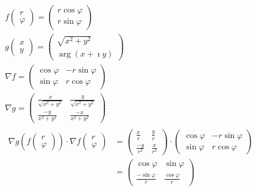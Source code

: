 \begin{bsp*}
	\begin{gather*}
		f\begin{pmatrix} r \\ \varphi \end{pmatrix} = \begin{pmatrix} r \cos \varphi \\ r \sin \varphi \end{pmatrix} \\
		g\begin{pmatrix} x \\ y \end{pmatrix} = \begin{pmatrix} \sqrt{x^2 + y^2} \\ \arg( x + \imath y ) \end{pmatrix} \\
		\nabla f = \begin{pmatrix} \cos \varphi &-r \sin \varphi \\ \sin \varphi & r \cos \varphi \end{pmatrix} \\
		\nabla g = \begin{pmatrix} \frac{x}{\sqrt{x^2+y^2}} & \frac{y}{\sqrt{x^2+y^2}} \\ \frac{-y}{x^2+y^2} & \frac{-x}{x^2+y^2} \end{pmatrix} \\
		\begin{split}
			\nabla g\left( f\begin{pmatrix} r \\ \varphi \end{pmatrix} \right) \cdot \nabla f\begin{pmatrix} r \\ \varphi \end{pmatrix}
				&= \begin{pmatrix} \frac{x}{r} & \frac{y}{r} \\ \frac{-y}{r^2} & \frac{x}{r^2} \end{pmatrix} \cdot \begin{pmatrix} \cos \varphi & -r \sin \varphi \\ \sin \varphi & r \cos \varphi \end{pmatrix} \\
				&= \begin{pmatrix} \cos \varphi & \sin \varphi \\ \frac{-\sin \varphi}{r} & \frac{\cos \varphi}{r} \end{pmatrix} \\

\end{split}
\end{gather*}
\end{bsp*}
